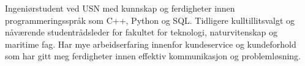 \normalsize Ingeniørstudent ved USN med kunnskap og ferdigheter innen programmeringsspråk som C++, Python og SQL. Tidligere kulltillitsvalgt og nåværende studentrådsleder for fakultet for teknologi, naturvitenskap og maritime fag. Har mye arbeidserfaring innenfor kundeservice og kundeforhold som har gitt meg ferdigheter innen effektiv kommunikasjon og problemløsning.
